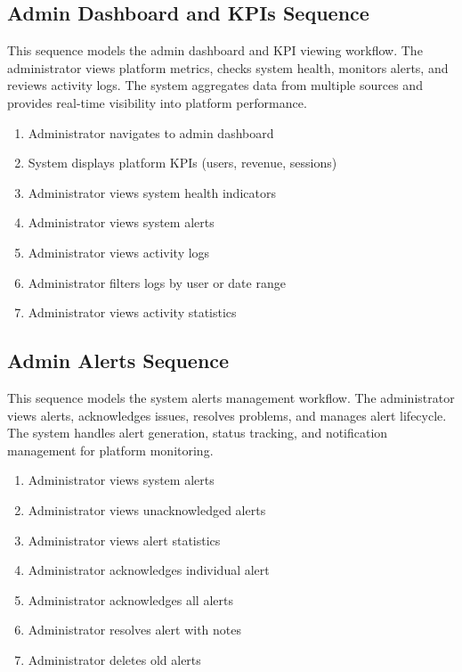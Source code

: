 \subsection{Admin Dashboard and KPIs Sequence}
This sequence models the admin dashboard and KPI viewing workflow. The
administrator views platform metrics, checks system health, monitors alerts,
and reviews activity logs. The system aggregates data from multiple sources and
provides real-time visibility into platform performance.

\begin{enumerate}[topsep=0pt,itemsep=1pt,parsep=0pt,partopsep=0pt]
    \item Administrator navigates to admin dashboard
    \item System displays platform KPIs (users, revenue, sessions)
    \item Administrator views system health indicators
    \item Administrator views system alerts
    \item Administrator views activity logs
    \item Administrator filters logs by user or date range
    \item Administrator views activity statistics
\end{enumerate}


\subsection{Admin Alerts Sequence}
This sequence models the system alerts management workflow. The administrator
views alerts, acknowledges issues, resolves problems, and manages alert
lifecycle. The system handles alert generation, status tracking, and
notification management for platform monitoring.

\begin{enumerate}[topsep=0pt,itemsep=1pt,parsep=0pt,partopsep=0pt]
    \item Administrator views system alerts
    \item Administrator views unacknowledged alerts
    \item Administrator views alert statistics
    \item Administrator acknowledges individual alert
    \item Administrator acknowledges all alerts
    \item Administrator resolves alert with notes
    \item Administrator deletes old alerts
\end{enumerate}

